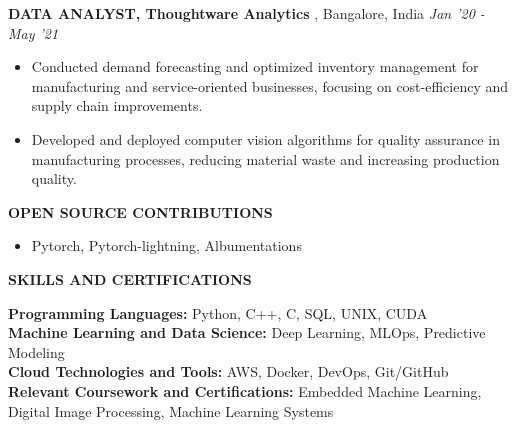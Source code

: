 \documentclass[10pt,a4]{article}
\def\hrulefill{\leavevmode\leaders\hrule height 1pt\hfill\kern 0pt}		%
\begin{document}
{\begin{flushleft}
		\textbf{\large DATA ANALYST, Thoughtware Analytics }, \large Bangalore, India \hfill \textit{\large Jan '20 - May '21}	\\		
		\begin{itemize}
			  
			\item Conducted demand forecasting and optimized inventory management for manufacturing and service-oriented businesses, focusing on cost-efficiency and supply chain improvements.
			\item Developed and deployed computer vision algorithms for quality assurance in manufacturing processes, reducing material waste and increasing production quality.   
        \end{itemize}	

        \textbf{\large OPEN SOURCE CONTRIBUTIONS}
        \begin{itemize}
            \item Pytorch, Pytorch-lightning, Albumentations
        \end{itemize}
\end{flushleft}
%		
	
	
%		
%		



\begin{flushleft}
    {\Large \textbf {SKILLS AND CERTIFICATIONS}}
    
        \vspace{1.5mm}
        \large \textbf{Programming Languages:} Python, C++, C, SQL, UNIX, CUDA \\
        \large \textbf{Machine Learning and Data Science:} Deep Learning, MLOps, Predictive Modeling   \\
        \large \textbf{Cloud Technologies and Tools:} AWS, Docker, DevOps, Git/GitHub \\
        \large \textbf{Relevant Coursework and Certifications:} Embedded Machine Learning, Digital Image Processing, Machine Learning Systems \\

\end{flushleft}
       
}
\end{document}
